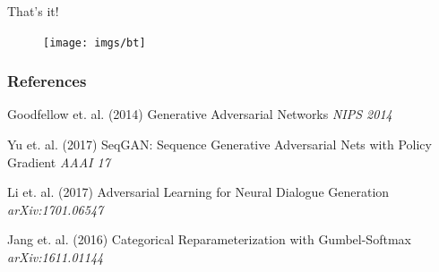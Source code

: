 \documentclass{beamer}
\begin{document}
\begin{frame}
\vspace{3cm}
\Huge{\centerline{That's it!}}
\begin{figure}
\hspace{-7cm}
\texttt{[image: imgs/bt]}
\end{figure}
\end{frame}


\begin{frame}
\frametitle{References}
\footnotesize{
\begin{thebibliography}{99} %
 Goodfellow et. al. (2014)
\newblock Generative Adversarial Networks
\newblock \emph{NIPS 2014}

 Yu et. al. (2017)
\newblock SeqGAN: Sequence Generative Adversarial Nets with Policy Gradient 
\newblock \emph{AAAI 17}

 Li et. al. (2017)
\newblock Adversarial Learning for Neural Dialogue Generation
\newblock \emph{arXiv:1701.06547}

 Jang et. al. (2016)
\newblock Categorical Reparameterization with Gumbel-Softmax
\newblock \emph{arXiv:1611.01144}


\end{thebibliography}
}
\end{frame}

\end{document}
